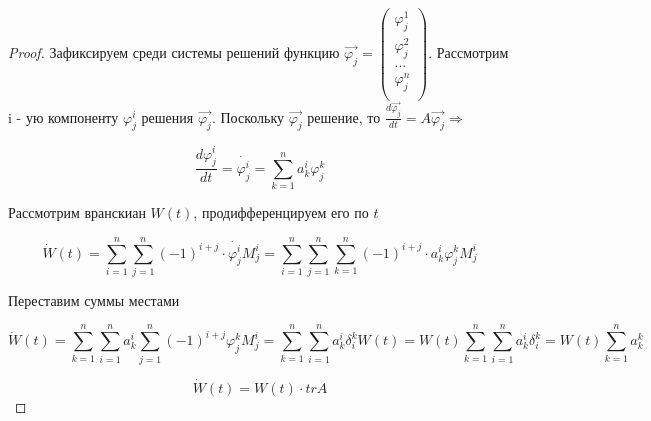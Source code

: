 \begin{proof}

Зафиксируем среди системы решений функцию $\vec{\varphi_j}=
\begin{pmatrix}
  \varphi_j^1 \\
  \varphi_j^2 \\
  ...   \\
  \varphi_j^n \\
\end{pmatrix}
$.
Рассмотрим i - ую компоненту $\varphi_j^i$ решения $\vec{\varphi_j}$. Поскольку $\vec{\varphi_j}$ решение, то $\frac{d\vec{\varphi_j}}{dt} = A\vec{\varphi_j} \Rightarrow$

\[\frac{d\varphi_j^i}{dt} = \dot{\varphi_j^i} = \sum\limits_{k = 1}^n{a_k^i \varphi_j^k}\]

Рассмотрим вранскиан $W(t)$, продифференцируем его по $t$

\[\dot{W}(t) = \sum\limits_{i = 1}^n{\sum\limits_{j = 1}^n{(-1)^{i + j} \cdot \dot{\varphi_j^i} M_j^i}} = \sum\limits_{i = 1}^n{\sum\limits_{j = 1}^n{\sum\limits_{k = 1}^n{(-1)^{i + j} \cdot a_k^i \varphi_j^k M_j^i}}}\]

Переставим суммы местами

\[\dot{W}(t) = \sum\limits_{k = 1}^n{\sum\limits_{i = 1}^n{a_k^i}{\sum\limits_{j = 1}^n{(-1)^{i + j} \varphi_j^k M_j^i}}} = \sum\limits_{k = 1}^n{\sum\limits_{i = 1}^n{a_k^i}\delta_i^k W(t)} = W(t)\sum\limits_{k = 1}^n{\sum\limits_{i = 1}^n{a_k^i}\delta_i^k} = W(t)\sum\limits_{k = 1}^n{a_k^k}\]

\[\dot{W}(t) = W(t) \cdot trA\]

\end{proof}

